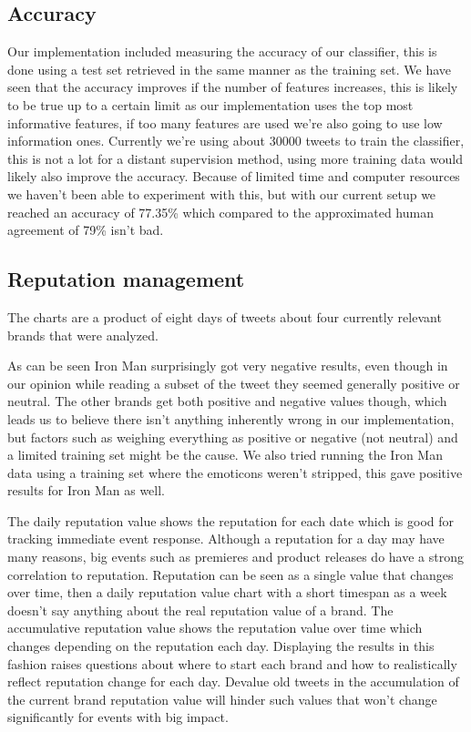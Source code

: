 \documentclass[a4paper]{article}
\begin{document}
\subsection{Accuracy}
Our implementation included measuring the accuracy of our classifier, this is done using a test set retrieved in the same manner as the training set. We have seen that the accuracy improves if the number of features increases, this is likely to be true up to a certain limit as our implementation uses the top most informative features, if too many features are used we’re also going to use low information ones. Currently we’re using about 30000 tweets to train the classifier, this is not a lot for a distant supervision method, using more training data would likely also improve the accuracy. Because of limited time and computer resources we haven’t been able to experiment with this, but with our current setup we reached an accuracy of 77.35\% which compared to the approximated human agreement of 79\% isn’t bad.

\subsection{Reputation management}
The charts are a product of eight days of tweets about four currently relevant brands that were analyzed. 

As can be seen Iron Man surprisingly got very negative results, even though in our opinion while reading a subset of the tweet they seemed generally positive or neutral. The other brands get both positive and negative values though, which leads us to believe there isn’t anything inherently wrong in our implementation, but factors such as weighing everything as positive or negative (not neutral) and a limited training set might be the cause. We also tried running the Iron Man data using a training set where the emoticons weren’t stripped, this gave positive results for Iron Man as well.

The daily reputation value shows the reputation for each date which is good for tracking immediate event response. Although a reputation for a day may have many reasons, big events such as premieres and product releases do have a strong correlation to reputation. Reputation can be seen as a single value that changes over time, then a daily reputation value chart with a short timespan as a week doesn’t say anything about the real reputation value of a brand. The accumulative reputation value shows the reputation value over time which changes depending on the reputation each day. Displaying the results in this fashion raises questions about where to start each brand and how to realistically reflect reputation change for each day. Devalue old tweets in the accumulation of the current brand reputation value will hinder such values that won’t change significantly for events with big impact.
\end{document}
